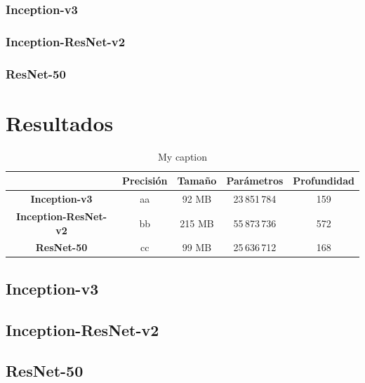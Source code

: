 \subsubsection{Inception-v3}





\subsubsection{Inception-ResNet-v2}




\subsubsection{ResNet-50}


















\section{Resultados}

\begin{table}
\centering
\label{my-label}
\begin{tabular}{c|c|c|c|c|}
\cline{2-5}
 & \textbf{Precisión} & \textbf{Tamaño} & \textbf{Parámetros} & \textbf{Profundidad} \\ \hline
\multicolumn{1}{|c|}{\textbf{Inception-v3}} & aa & 92 MB & 23\,851\,784 & 159 \\ \hline
\multicolumn{1}{|c|}{\textbf{Inception-ResNet-v2}} & bb & 215 MB & 55\,873\,736 & 572 \\ \hline
\multicolumn{1}{|c|}{\textbf{ResNet-50}} & cc & 99 MB & 25\,636\,712 & 168 \\ \hline
\end{tabular}
\caption{My caption} \label{Table:Models}
\end{table}



\subsection{Inception-v3}

\cite{Inception-v3}

\subsection{Inception-ResNet-v2}


\cite{Inception-ResNet}


\subsection{ResNet-50}

\cite{ResNet}



